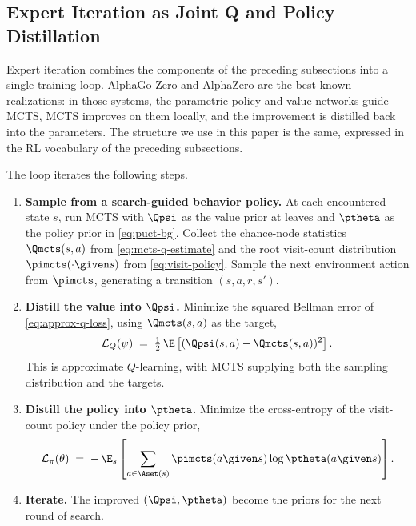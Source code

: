 \subsection{Expert Iteration as Joint Q and Policy Distillation}
\label{sec:background-expit}

Expert iteration \citep{anthony2017thinking} combines the components of
the preceding subsections into a single training loop. AlphaGo Zero and
AlphaZero \citep{silver2017alphagozero, silver2018alphazero} are the
best-known realizations: in those systems, the parametric policy and
value networks guide MCTS, MCTS improves on them locally, and the
improvement is distilled back into the parameters. The structure we use
in this paper is the same, expressed in the RL vocabulary of the
preceding subsections.

The loop iterates the following steps.
\begin{enumerate}[leftmargin=*,itemsep=2pt]
  \item \textbf{Sample from a search-guided behavior policy.} At each
    encountered state $s$, run MCTS with $\Qpsi$ as the value prior at
    leaves and $\ptheta$ as the policy prior in
    \eqref{eq:puct-bg}. Collect the chance-node statistics
    $\Qmcts(s, a)$ from \eqref{eq:mcts-q-estimate} and the root
    visit-count distribution $\pimcts(\cdot \given s)$ from
    \eqref{eq:visit-policy}. Sample the next environment action from
    $\pimcts$, generating a transition $(s, a, r, s')$.
  \item \textbf{Distill the value into $\Qpsi$.} Minimize the squared
    Bellman error of \eqref{eq:approx-q-loss}, using $\Qmcts(s, a)$ as
    the target,
    \begin{equation}
    \mathcal{L}_Q(\psi)
    \;=\; \tfrac{1}{2}\, \E \left[ (\Qpsi(s, a) - \Qmcts(s, a))^2 \right].
    \label{eq:expit-q-loss}
    \end{equation}
    This is approximate $Q$-learning, with MCTS supplying both the
    sampling distribution and the targets.
  \item \textbf{Distill the policy into $\ptheta$.} Minimize the
    cross-entropy of the visit-count policy under the policy prior,
    \begin{equation}
    \mathcal{L}_{\pi}(\theta)
    \;=\; -\,\E_s \left[
      \sum_{a \in \Aset(s)} \pimcts(a \given s) \log \ptheta(a \given s)
    \right].
    \label{eq:expit-pi-loss}
    \end{equation}
  \item \textbf{Iterate.} The improved $(\Qpsi, \ptheta)$ become the
    priors for the next round of search.
\end{enumerate}

